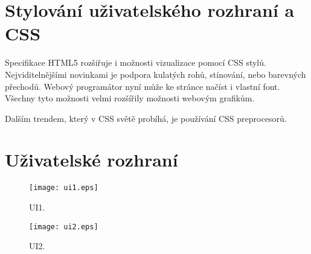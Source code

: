 \section{Stylování uživatelského rozhraní a CSS}

Specifikace HTML5 rozšiřuje i možnosti vizualizace pomocí CSS stylů. Nejviditelnějšími novinkami je podpora kulatých rohů, stínování, nebo barevných přechodů. Webový programátor nyní může ke stránce načíst i vlastní font. Všechny tyto možnosti velmi rozšířily možnosti webovým grafikům.

Dalším trendem, který v CSS světě probíhá, je používání CSS preprocesorů. 


\section{Uživatelské rozhraní}

\begin{figure}[h]
  \centering
  \texttt{[image: ui1.eps]}
  \caption{UI1.}
  \label{fig:ui1}
\end{figure}

\begin{figure}[h]
  \centering
  \texttt{[image: ui2.eps]}
  \caption{UI2.}
  \label{fig:ui1}
\end{figure}




